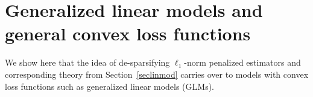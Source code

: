 \documentclass[aos,MSNbibl,dvips]{arximspdf}
\def\cal{\mathcal}
\newcommand{\PP}{\mathbb{P}}
\newcommand{\eps}{\varepsilon}
\begin{document}
%

%
%
%

\section{Generalized linear models and general convex loss
functions}\label{secGLM}

We show here that the idea of de-sparsifying $\ell_1$-norm penalized
estimators and corresponding theory from Section~\ref{seclinmod}
carries over to models with convex loss functions such as generalized
linear models (GLMs).
\end{document}
